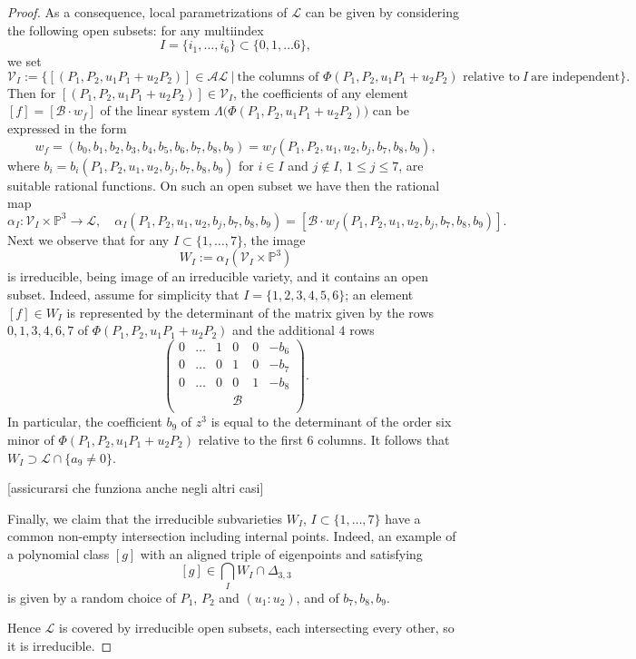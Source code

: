 \documentclass{amsart}
\theoremstyle{plain}
\theoremstyle{definition}
\newcommand{\p}{\mathbb{P}}
\newcommand{\sL}{\mathcal{L}}
\newcommand{\sV}{\mathcal{V}}
\newcommand{\blue}[1]{{\color{blue}  [#1]}}
\begin{document}
\begin{proof}
As a consequence, local parametrizations of $\sL$ can be given by considering the following open subsets:
for any multiindex
$$
I =\{i_1,\dots,i_6\}\subset \{ 0, 1,\dots 6\},
$$
we set
$$
\sV_I := \{ [(P_1, P_2, u_1 P_1 +u_2P_2)] \in \mathcal {AL} \ | \ \text{the\  columns\ of\ } \Phi
(P_1, P_2, u_1 P_1 +u_2P_2) \text{\ relative \ to} \ I\ \text{are\ independent}\}.
$$
Then for $[(P_1, P_2, u_1 P_1 +u_2P_2)]\in \sV_I$, the coefficients of any element
$[f] =[{\mathcal B} \cdot w_f]$ of the linear system
$\Lambda \bigl( \Phi (P_1, P_2, u_1 P_1 +u_2P_2) \bigr)$ can be expressed in the form
\begin{equation}\label{eq: parametrizzazione}
w_f =(b_0,
b_1,
b_2,
b_3,
b_4,
b_5, b_6,b_7,b_8,b_9)=w_f(P_1,P_2,u_1,u_2,b_j,b_7,b_8,b_9),
\end{equation}
where $b_i=b_i (P_1,P_2,u_1,u_2,b_j,b_7,b_8,b_9)$ for $i\in I$ and $j\not \in I$, $1\le j \le 7$, are suitable rational functions. On such an open subset we have then the rational
map
$$
\alpha_I : \sV_I \times \p^3 \to \sL, \quad
\alpha_I (P_1,P_2,u_1,u_2,b_j,b_7,b_8,b_9)=
[{\mathcal B} \cdot w_f(P_1,P_2,u_1,u_2,b_j,b_7,b_8,b_9)].
$$
Next we observe that for any $I \subset \{1,\dots, 7\}$, the image
$$
W_I:=\alpha_I (\sV_I \times \p^3)
$$
is irreducible, being image of an irreducible variety, and it
contains an open subset. Indeed, assume for simplicity that
$I=\{1,2,3,4,5,6\}$; an element $[f]\in W_I$ is represented by the determinant of the
matrix given by the rows $0,1,3,4,6,7$ of $\Phi (P_1, P_2, u_1 P_1 +u_2P_2)$ and the additional $4$ rows
\[
 \left(
 \begin{array}{cccccc}
  0 & \dots & 1&0&0&-b_6 \\
 0 & \dots & 0&1&0&-b_7 \\
 0 & \dots & 0&0&1&-b_8 \\
  & & &\mathcal {B} & & \\
 \end{array}
 \right).
\]
In particular, the coefficient $b_9$ of $z^3$ is equal to the determinant of the order six minor of $\Phi (P_1, P_2, u_1 P_1 +u_2P_2)$ relative to the first $6$ columns. It follows that $W_I \supset \sL \cap \{ a_9 \neq 0\}$.

\blue{assicurarsi che funziona anche negli altri casi}

Finally, we claim that the irreducible subvarieties $W_I$, $I\subset \{1,\dots, 7\}$ have a common non-empty intersection
including internal points. Indeed, an example of a polynomial
class $[g]$ with an aligned triple of eigenpoints and satisfying
$$
[g] \in \bigcap _I W_I \cap \Delta_{3,3}
$$
is given by a random choice of $P_1$, $P_2$ and $(u_1:u_2)$, and of $b_7,b_8,b_9$.


Hence $\sL$ is covered by irreducible open subsets, each intersecting every other, so it is irreducible.
\end{proof}
\end{document}
